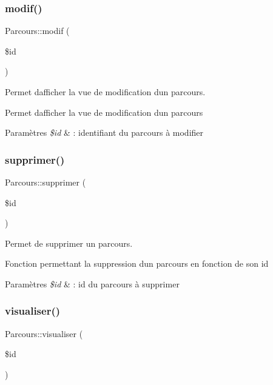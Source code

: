 \subsubsection{\texorpdfstring{modif()}{modif()}}
{\footnotesize\ttfamily Parcours\+::modif (\begin{DoxyParamCaption}\item[{}]{\$id }\end{DoxyParamCaption})}



Permet d\textquotesingle{}afficher la vue de modification d\textquotesingle{}un parcours. 

Permet d\textquotesingle{}afficher la vue de modification d\textquotesingle{}un parcours 
\begin{DoxyParams}{Paramètres}
{\em \$id} & \+: identifiant du parcours à modifier \\
\hline
\end{DoxyParams}
\mbox{\label{class_parcours_ade2bfb6cd293fac7431d3fabb1bb0496}} 
\subsubsection{\texorpdfstring{supprimer()}{supprimer()}}
{\footnotesize\ttfamily Parcours\+::supprimer (\begin{DoxyParamCaption}\item[{}]{\$id }\end{DoxyParamCaption})}



Permet de supprimer un parcours. 

Fonction permettant la suppression d\textquotesingle{}un parcours en fonction de son id 
\begin{DoxyParams}{Paramètres}
{\em \$id} & \+: id du parcours à supprimer \\
\hline
\end{DoxyParams}
\mbox{\label{class_parcours_ae7f7d51047a8f50bd396a6f345e4058f}} 
\subsubsection{\texorpdfstring{visualiser()}{visualiser()}}
{\footnotesize\ttfamily Parcours\+::visualiser (\begin{DoxyParamCaption}\item[{}]{\$id }\end{DoxyParamCaption})}




